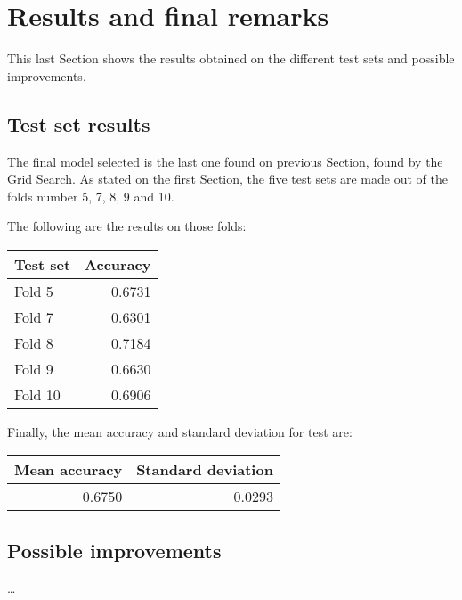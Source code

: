 \section{Results and final remarks}
\label{results}

This last Section shows the results obtained on the different 
test sets and possible improvements.

\subsection{Test set results}
The final model selected is the last one found on previous Section, 
found by the Grid Search.
As stated on the first Section, the five test sets are made out of the 
folds number 5, 7, 8, 9 and 10. 

The following are the results on those folds:

\begin{center}
    \begin{tabular}{ |l|r| } 
        \hline
        Test set & Accuracy\\
        \hline
        Fold 5 & 0.6731 \\
        Fold 7 & 0.6301 \\
        Fold 8 & 0.7184 \\
        Fold 9 & 0.6630 \\
        Fold 10 & 0.6906 \\
        \hline
    \end{tabular}
\end{center}

Finally, the mean accuracy and standard deviation for test are: 
\begin{center}
    \begin{tabular}{ |r|r| } 
        \hline
        Mean accuracy & Standard deviation\\
        \hline
        0.6750 & 0.0293 \\
        \hline
    \end{tabular}
\end{center}

\subsection{Possible improvements}
\dots